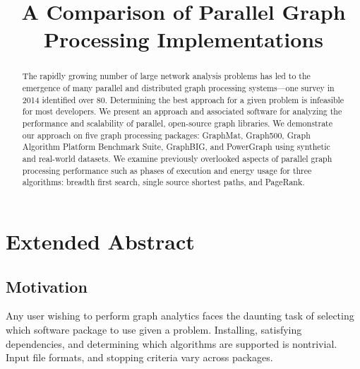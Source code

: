 \documentclass[conference]{IEEEtran}
\begin{document}
\title{A Comparison of Parallel Graph Processing Implementations}
\author{
	\and
}
\maketitle

\begin{abstract}
The rapidly growing number of large network analysis problems has led to the emergence of many parallel and distributed graph processing systems---one survey in 2014 identified over 80. Determining the best approach for a given problem is infeasible for most developers. We present an approach and associated software for analyzing the performance and scalability of parallel, open-source graph libraries. We demonstrate our approach on five graph processing packages: GraphMat, Graph500, Graph Algorithm Platform Benchmark Suite, GraphBIG, and PowerGraph using synthetic and real-world datasets. We examine previously overlooked aspects of parallel graph processing performance such as phases of execution and energy usage for three algorithms: breadth first search, single source shortest paths, and PageRank.
\end{abstract}

\section{Extended Abstract}

\subsection{Motivation}
Any user wishing to perform graph analytics faces the daunting task of selecting which software package to use given a problem. Installing, satisfying dependencies, and determining which algorithms are supported is nontrivial. Input file formats, and stopping criteria vary across packages.
\end{document}
